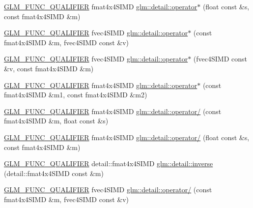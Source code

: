 \begin{DoxyCompactItemize}
\hyperlink{setup_8hpp_a33fdea6f91c5f834105f7415e2a64407}{G\+L\+M\+\_\+\+F\+U\+N\+C\+\_\+\+Q\+U\+A\+L\+I\+F\+I\+ER} fmat4x4\+S\+I\+MD \hyperlink{namespaceglm_1_1detail_a8ab387a0948c211143bbb41dd8fda30c}{glm\+::detail\+::operator$\ast$} (float const \&s, const fmat4x4\+S\+I\+MD \&m)
\item 
\hyperlink{setup_8hpp_a33fdea6f91c5f834105f7415e2a64407}{G\+L\+M\+\_\+\+F\+U\+N\+C\+\_\+\+Q\+U\+A\+L\+I\+F\+I\+ER} fvec4\+S\+I\+MD \hyperlink{namespaceglm_1_1detail_a8ba6a9d268faa4277d6734a2da036c4d}{glm\+::detail\+::operator$\ast$} (const fmat4x4\+S\+I\+MD \&m, fvec4\+S\+I\+MD const \&v)
\item 
\hyperlink{setup_8hpp_a33fdea6f91c5f834105f7415e2a64407}{G\+L\+M\+\_\+\+F\+U\+N\+C\+\_\+\+Q\+U\+A\+L\+I\+F\+I\+ER} fvec4\+S\+I\+MD \hyperlink{namespaceglm_1_1detail_a0f6596e928f7dc3fb62a38bb5df08d18}{glm\+::detail\+::operator$\ast$} (fvec4\+S\+I\+MD const \&v, const fmat4x4\+S\+I\+MD \&m)
\item 
\hyperlink{setup_8hpp_a33fdea6f91c5f834105f7415e2a64407}{G\+L\+M\+\_\+\+F\+U\+N\+C\+\_\+\+Q\+U\+A\+L\+I\+F\+I\+ER} fmat4x4\+S\+I\+MD \hyperlink{namespaceglm_1_1detail_a628d3f0d2c16d6207ca18a11ad66261c}{glm\+::detail\+::operator$\ast$} (const fmat4x4\+S\+I\+MD \&m1, const fmat4x4\+S\+I\+MD \&m2)
\item 
\hyperlink{setup_8hpp_a33fdea6f91c5f834105f7415e2a64407}{G\+L\+M\+\_\+\+F\+U\+N\+C\+\_\+\+Q\+U\+A\+L\+I\+F\+I\+ER} fmat4x4\+S\+I\+MD \hyperlink{namespaceglm_1_1detail_aa8f3ac302faac4a9d5c0e49321ccf9cb}{glm\+::detail\+::operator/} (const fmat4x4\+S\+I\+MD \&m, float const \&s)
\item 
\hyperlink{setup_8hpp_a33fdea6f91c5f834105f7415e2a64407}{G\+L\+M\+\_\+\+F\+U\+N\+C\+\_\+\+Q\+U\+A\+L\+I\+F\+I\+ER} fmat4x4\+S\+I\+MD \hyperlink{namespaceglm_1_1detail_a33235564824caa327d104e227bc64045}{glm\+::detail\+::operator/} (float const \&s, const fmat4x4\+S\+I\+MD \&m)
\item 
\hyperlink{setup_8hpp_a33fdea6f91c5f834105f7415e2a64407}{G\+L\+M\+\_\+\+F\+U\+N\+C\+\_\+\+Q\+U\+A\+L\+I\+F\+I\+ER} detail\+::fmat4x4\+S\+I\+MD \hyperlink{namespaceglm_1_1detail_a4d5c895b3548f6c8296fd6a9980fe3e1}{glm\+::detail\+::inverse} (detail\+::fmat4x4\+S\+I\+MD const \&m)
\item 
\hyperlink{setup_8hpp_a33fdea6f91c5f834105f7415e2a64407}{G\+L\+M\+\_\+\+F\+U\+N\+C\+\_\+\+Q\+U\+A\+L\+I\+F\+I\+ER} fvec4\+S\+I\+MD \hyperlink{namespaceglm_1_1detail_a9041c53e82c0b0191b24185e14e2b55f}{glm\+::detail\+::operator/} (const fmat4x4\+S\+I\+MD \&m, fvec4\+S\+I\+MD const \&v)

\end{DoxyCompactItemize}
